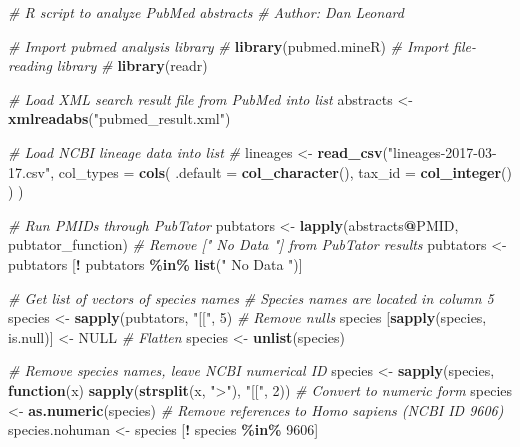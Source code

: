 \documentclass[american]{../../../coursework}
\newenvironment{Shaded}{\begin{snugshade}}{\end{snugshade}}
\newcommand{\CommentTok}[1]{\textcolor[rgb]{0.56,0.35,0.01}{\textit{#1}}}
\newcommand{\ControlFlowTok}[1]{\textcolor[rgb]{0.13,0.29,0.53}{\textbf{#1}}}
\newcommand{\DataTypeTok}[1]{\textcolor[rgb]{0.13,0.29,0.53}{#1}}
\newcommand{\DecValTok}[1]{\textcolor[rgb]{0.00,0.00,0.81}{#1}}
\newcommand{\KeywordTok}[1]{\textcolor[rgb]{0.13,0.29,0.53}{\textbf{#1}}}
\newcommand{\NormalTok}[1]{#1}
\newcommand{\OperatorTok}[1]{\textcolor[rgb]{0.81,0.36,0.00}{\textbf{#1}}}
\newcommand{\OtherTok}[1]{\textcolor[rgb]{0.56,0.35,0.01}{#1}}
\newcommand{\StringTok}[1]{\textcolor[rgb]{0.31,0.60,0.02}{#1}}
\begin{document}
\begin{Shaded}
    \begin{Highlighting}[]
    \CommentTok{\# R script to analyze PubMed abstracts}
    \CommentTok{\# Author: Dan Leonard}
    
    \CommentTok{\# Import pubmed analysis library}
    \CommentTok{\# \parencite{Ran19}}
    \KeywordTok{library}\NormalTok{(pubmed.mineR)}
    \CommentTok{\# Import file{-}reading library}
    \CommentTok{\# \parencite{Wic18}}
    \KeywordTok{library}\NormalTok{(readr)}
    
    \CommentTok{\# Load XML search result file from PubMed into list}
    \NormalTok{abstracts <{-}}\StringTok{ }\KeywordTok{xmlreadabs}\NormalTok{(}\StringTok{"pubmed\_result.xml"}\NormalTok{)}
    
    \CommentTok{\# Load NCBI lineage data into list}
    \CommentTok{\# \parencite{Xue19}}
    \NormalTok{lineages <{-}}\StringTok{ }\KeywordTok{read\_csv}\NormalTok{(}\StringTok{"lineages{-}2017{-}03{-}17.csv"}\NormalTok{,}
        \DataTypeTok{col\_types =} \KeywordTok{cols}\NormalTok{(}
            \DataTypeTok{.default =} \KeywordTok{col\_character}\NormalTok{(),}
            \DataTypeTok{tax\_id =} \KeywordTok{col\_integer}\NormalTok{()}
    \NormalTok{    )}
    \NormalTok{)}
    
    \CommentTok{\# Run PMIDs through PubTator}
    \NormalTok{pubtators <{-}}\StringTok{ }\KeywordTok{lapply}\NormalTok{(abstracts}\OperatorTok{@}\NormalTok{PMID, pubtator\_function)}
    \CommentTok{\# Remove [" No Data "] from PubTator results}
    \NormalTok{pubtators <{-}}\StringTok{ }\NormalTok{pubtators [}\OperatorTok{!}\StringTok{ }\NormalTok{pubtators }\OperatorTok{\%in\%}\StringTok{ }\KeywordTok{list}\NormalTok{(}\StringTok{" No Data "}\NormalTok{)]}
    
    \CommentTok{\# Get list of vectors of species names}
    \CommentTok{\# Species names are located in column 5}
    \NormalTok{species <{-}}\StringTok{ }\KeywordTok{sapply}\NormalTok{(pubtators, }\StringTok{"[["}\NormalTok{, }\DecValTok{5}\NormalTok{)}
    \CommentTok{\# Remove nulls}
    \NormalTok{species [}\KeywordTok{sapply}\NormalTok{(species, is.null)] <{-}}\StringTok{ }\OtherTok{NULL}
    \CommentTok{\# Flatten}
    \NormalTok{species <{-}}\StringTok{ }\KeywordTok{unlist}\NormalTok{(species)}
    
    \CommentTok{\# Remove species names, leave NCBI numerical ID}
    \NormalTok{species <{-}}\StringTok{ }\KeywordTok{sapply}\NormalTok{(species, }\ControlFlowTok{function}\NormalTok{(x) }\KeywordTok{sapply}\NormalTok{(}\KeywordTok{strsplit}\NormalTok{(x, }\StringTok{">"}\NormalTok{), }\StringTok{"[["}\NormalTok{, }\DecValTok{2}\NormalTok{))}
    \CommentTok{\# Convert to numeric form}
    \NormalTok{species <{-}}\StringTok{ }\KeywordTok{as.numeric}\NormalTok{(species)}
    \CommentTok{\# Remove references to Homo sapiens (NCBI ID 9606)}
    \NormalTok{species.nohuman <{-}}\StringTok{ }\NormalTok{species [}\OperatorTok{!}\StringTok{ }\NormalTok{species }\OperatorTok{\%in\%}\StringTok{ }\DecValTok{9606}\NormalTok{]}
    

\end{Highlighting}
\end{Shaded}
\end{document}
